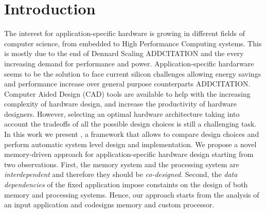 \section{Introduction}
The interest for application-specific hardware is growing in different fields of computer science, from embedded to High Performance Computing systems. This is mostly due to the end of Dennard Scaling ADDCITATION
and the every increasing demand for performance and power. Application-specific hardarware seems to be the solution to face current silicon challenges allowing energy savings and performance increase over general purpose counterparts ADDCITATION.  
%
Computer Aided Design (CAD) tools are available to help with the increasing complexity of hardware design, and increase the productivity of hardware designers. However, selecting an optimal hardware architecture taking into account the tradeoffs of all the possible design choices is still a challenging task.
In this work we present \frameworkname, a framework that allows to compare design choices and perform automatic system level design and implementation. We propose a novel memory-driven approach for application-specific hardware design starting from two observations. First, the memory system and the processing system are \textit{interdependent} and therefore they should be \textit{co-designed}. Second, the \textit{data dependencies} of the fixed application impose constaints on the design of both memory and processing systems. Hence, our approach starts from the analysis of an input application and codesigns memory and custom processor. 

